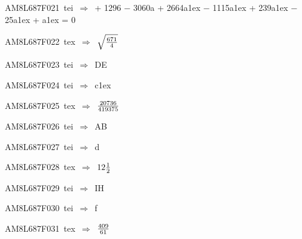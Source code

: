 {\sixrm AM8L687F021\ {\sixit tei}\ }$\Rightarrow$\ + 1296 − 3060{\tenit a} + 2664{\tenit a}\raise1ex\hbox{} − 1115{\tenit a}\raise1ex\hbox{} + 239{\tenit a}\raise1ex\hbox{} − 25{\tenit a}\raise1ex\hbox{} 
+ {\tenit a}\raise1ex\hbox{} = 0\par\smallskip
{\sixrm AM8L687F022\ {\sixit tex}\ }$\Rightarrow$\ $\sqrt{{671\over 4}}$\par\smallskip
{\sixrm AM8L687F023\ {\sixit tei}\ }$\Rightarrow$\ DE\par\smallskip
{\sixrm AM8L687F024\ {\sixit tei}\ }$\Rightarrow$\ {\tenit c}\raise1ex\hbox{}\par\smallskip
{\sixrm AM8L687F025\ {\sixit tex}\ }$\Rightarrow$\ ${20736\over 419375}$\par\smallskip
{\sixrm AM8L687F026\ {\sixit tei}\ }$\Rightarrow$\ AB\par\smallskip
{\sixrm AM8L687F027\ {\sixit tei}\ }$\Rightarrow$\ {\tenit d}\par\smallskip
{\sixrm AM8L687F028\ {\sixit tex}\ }$\Rightarrow$\ $12{{1\over 2}}$\par\smallskip
{\sixrm AM8L687F029\ {\sixit tei}\ }$\Rightarrow$\ IH\par\smallskip
{\sixrm AM8L687F030\ {\sixit tei}\ }$\Rightarrow$\ {\tenit f}\par\smallskip
{\sixrm AM8L687F031\ {\sixit tex}\ }$\Rightarrow$\ ${409\over 61}$\par\smallskip

